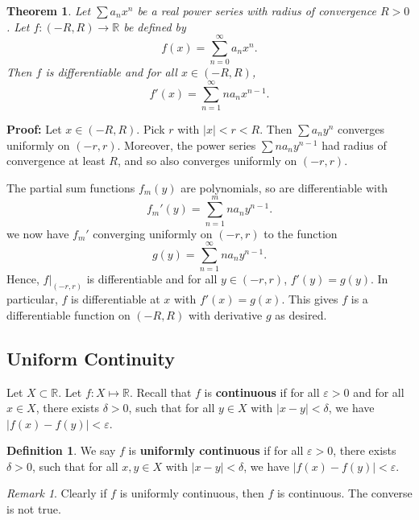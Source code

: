 \documentclass[12pt]{article}
\newtheorem{theorem}{Theorem}[section]
\theoremstyle{definition}
\newtheorem{definition}{Definition}[section]
\theoremstyle{remark}
\newtheorem*{remark}{Remark}
\begin{document}
\begin{theorem}
	Let $\sum a_n x^{n}$ be a real power series with radius of convergence $R > 0$. Let $f : (-R, R) \to \mathbb{R}$ be defined by
	\[
		f(x) = \sum_{n = 0}^{\infty}a_n x^{n}
	.\]
	Then $f$ is differentiable and for all $x \in (-R, R)$,
	\[
		f'(x) = \sum_{n = 1}^{\infty}n a_n x^{n-1}
	.\]
\end{theorem}

\begin{adjustbox}{minipage = \columnwidth - 25.5pt, margin=1em, frame=1pt, margin=0em}
	\textbf{Proof:} Let $x \in (-R, R)$. Pick $r$ with $|x| < r < R$. Then $\sum a_n y^{n}$ converges uniformly on $(-r, r)$. Moreover, the power series $\sum n a_n y^{n-1}$ had radius of convergence at least $R$, and so also converges uniformly on $(-r, r)$.

	The partial sum functions $f_m(y)$ are polynomials, so are differentiable with
	\[
		f_m'(y) = \sum_{n = 1}^{m} n a_n y^{n-1}
	.\]
	we now have $f_m'$ converging uniformly on $(-r, r)$ to the function
	\[
		g(y) = \sum_{n = 1}^{\infty}n a_n y^{n-1}
	.\]
	Hence, $f|_{(-r, r)}$ is differentiable and for all $y \in (-r, r)$, $f'(y) = g(y)$. In particular, $f$ is differentiable at $x$ with $f'(x) = g(x)$. This gives $f$ is a differentiable function on $(-R, R)$ with derivative $g$ as desired.
\end{adjustbox}

\subsection{Uniform Continuity}%
\label{sub:uniform_continuity}

Let $X \subset \mathbb{R}$. Let $f : X \mapsto \mathbb{R}$. Recall that $f$ is \textbf{continuous} if for all $\varepsilon > 0$ and for all $x \in X$, there exists $\delta > 0$, such that for all $y \in X$ with $|x - y| < \delta$, we have $|f(x) - f(y)| < \varepsilon$.

\begin{definition}
	We say $f$ is \textbf{uniformly continuous} if for all $\varepsilon > 0$, there exists $\delta > 0$, such that for all $x, y \in X$ with $|x - y| < \delta$, we have $|f(x) - f(y)| < \varepsilon$.
\end{definition}

\begin{remark}
	Clearly if $f$ is uniformly continuous, then $f$ is continuous. The converse is not true.
\end{remark}
\end{document}
